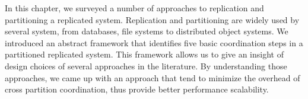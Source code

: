 In this chapter, we surveyed a number of approaches to replication and
partitioning a replicated system. Replication and partitioning are widely used
by several system, from databases, file systems to distributed object systems.
We introduced an abstract framework that identifies five basic coordination
steps in a partitioned replicated system. This framework allows us to give an
insight of design choices of several approaches in the literature. By
understanding those approaches, we came up with an approach that tend to
minimize the overhead of cross partition coordination, thus provide better
performance scalability.



















